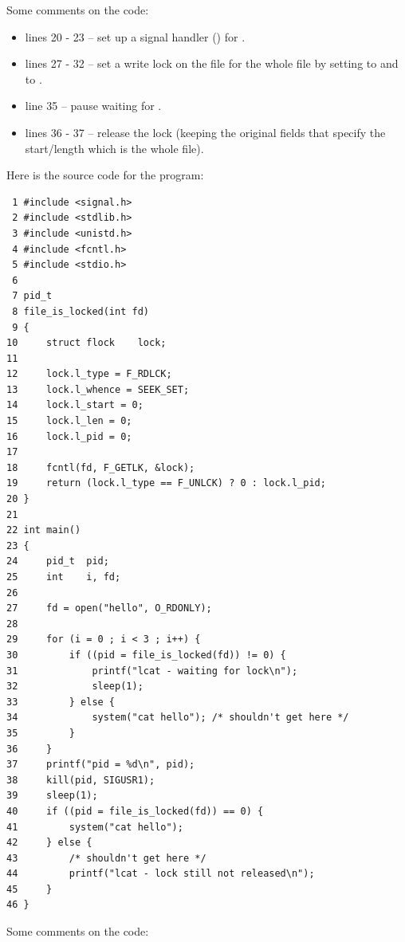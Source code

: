 \noindent
Some comments on the code:

\begin{itemize}
	\item lines 20 - 23 -- set up a signal handler () for .
	\item lines 27 - 32 -- set a write lock on the file for the whole file by setting  to  and  to . 
	\item line 35 -- pause waiting for .
	\item lines 36 - 37 -- release the lock (keeping the original fields that specify the start/length which is the whole file).
\end{itemize}

\noindent
Here is the source code for the  program:

\begin{lstlisting}
 1 #include <signal.h>
 2 #include <stdlib.h>
 3 #include <unistd.h>
 4 #include <fcntl.h>
 5 #include <stdio.h>
 6 
 7 pid_t
 8 file_is_locked(int fd)
 9 {
10     struct flock    lock;
11 
12     lock.l_type = F_RDLCK;
13     lock.l_whence = SEEK_SET;
14     lock.l_start = 0;
15     lock.l_len = 0;
16     lock.l_pid = 0;
17 
18     fcntl(fd, F_GETLK, &lock);
19     return (lock.l_type == F_UNLCK) ? 0 : lock.l_pid;
20 }
21 
22 int main()
23 {
24     pid_t  pid;
25     int    i, fd;
26 
27     fd = open("hello", O_RDONLY);
28 
29     for (i = 0 ; i < 3 ; i++) {
30         if ((pid = file_is_locked(fd)) != 0) {
31             printf("lcat - waiting for lock\n");
32             sleep(1);
33         } else {
34             system("cat hello"); /* shouldn't get here */
35         }
36     }
37     printf("pid = %d\n", pid);
38     kill(pid, SIGUSR1);
39     sleep(1);
40     if ((pid = file_is_locked(fd)) == 0) {
41         system("cat hello");
42     } else {
43         /* shouldn't get here */
44         printf("lcat - lock still not released\n");
45     }
46 }
\end{lstlisting}

\noindent
Some comments on the code:

